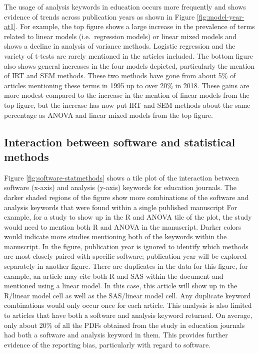 \documentclass[
  english,
  ,man]{apa7}
\begin{document}
The usage of analysis keywords in education occurs more frequently and shows evidence of trends across publication years as shown in Figure \ref{fig:model-year-at1}. For example, the top figure shows a large increase in the prevalence of terms related to linear models (i.e.~regression models) or linear mixed models and shows a decline in analysis of variance methods. Logistic regression and the variety of t-tests are rarely mentioned in the articles included. The bottom figure also shows general increases in the four models depicted, particularly the mention of IRT and SEM methods. These two methods have gone from about 5\% of articles mentioning these terms in 1995 up to over 20\% in 2018. These gains are more modest compared to the increase in the mention of linear models from the top figure, but the increase has now put IRT and SEM methods about the same percentage as ANOVA and linear mixed models from the top figure.

\hypertarget{interaction-between-software-and-statistical-methods}{%
\subsection{Interaction between software and statistical methods}\label{interaction-between-software-and-statistical-methods}}

Figure \ref{fig:software-statmethods} shows a tile plot of the interaction between software (x-axis) and analysis (y-axis) keywords for education journals. The darker shaded regions of the figure show more combinations of the software and analysis keywords that were found within a single published manuscript For example, for a study to show up in the R and ANOVA tile of the plot, the study would need to mention both R and ANOVA in the manuscript. Darker colors would indicate more studies mentioning both of the keywords within the manuscript. In the figure, publication year is ignored to identify which methods are most closely paired with specific software; publication year will be explored separately in another figure. There are duplicates in the data for this figure, for example, an article may cite both R and SAS within the document and mentioned using a linear model. In this case, this article will show up in the R/linear model cell as well as the SAS/linear model cell. Any duplicate keyword combinations would only occur once for each article. This analysis is also limited to articles that have both a software and analysis keyword returned. On average, only about 20\% of all the PDFs obtained from the study in education journals had both a software and analysis keyword in them. This provides further evidence of the reporting bias, particularly with regard to software.
\end{document}
